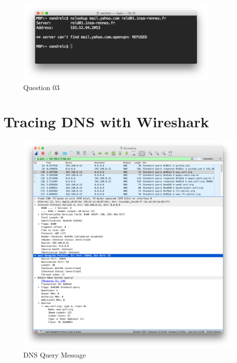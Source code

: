 \documentclass[11pt]{article}
\begin{document}
\begin{itemize}
		\begin{figure}[H]
		\centering
		\caption{Question 03}
		\includegraphics[width=375px]{03}
		\end{figure}
	
\end{itemize}

\section{Tracing DNS with Wireshark}

		\begin{figure}[H]
		\centering
		\caption{DNS Query Message}
		\includegraphics[width=460px]{04}
		\end{figure}
		
\end{document}
